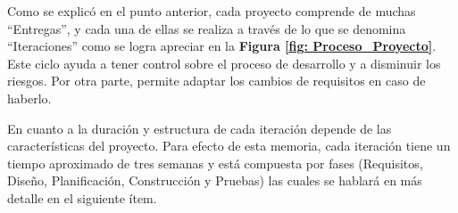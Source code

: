 Como se explicó en el punto anterior, cada proyecto comprende de muchas ``Entregas'', y cada una de ellas se realiza a través de lo que se denomina ``Iteraciones'' como se logra apreciar en la \textbf{Figura \ref{fig: Proceso_Proyecto}}. Este ciclo ayuda a tener control sobre el proceso de desarrollo y a disminuir los riesgos. Por otra parte, permite adaptar los cambios de requisitos en caso de haberlo. 

En cuanto a la duración y estructura de cada iteración depende de las características del proyecto. Para efecto de esta memoria, cada iteración tiene un tiempo aproximado de tres semanas y está compuesta por fases (Requisitos, Diseño, Planificación, Construcción y Pruebas) las cuales se hablará en más detalle en el siguiente ítem.


